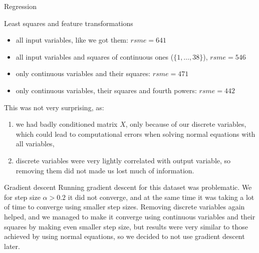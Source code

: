 \documentclass{article}
\begin{document}
\begin{section}{Regression}
\begin{subsection}{Least squares and feature transformations}
\begin{itemize}
\item all input variables, like we got them: $rsme=641$
\item all input variables and squares of continuous ones ($\{1, \ldots, 38\}$), $rsme = 546$
\item only continuous variables and their squares: $rsme = 471$
\item only continuous variables, their squares and fourth powers: $rsme = 442$
\end{itemize}
This was not very surprising, as:
\begin{enumerate}
\item we had badly conditioned matrix $X$, only because of our discrete variables, which could lead to computational errors when solving normal equations with all variables,
\item discrete variables were very lightly correlated with output variable, so removing them did not made us lost much of information.
\end{enumerate}
\end{subsection}
\begin{subsection}{Gradient descent}
Running gradient descent for this dataset was problematic. We for step size $\alpha > 0.2$ it did not converge, and at the same time it was taking a lot of time to converge using smaller step sizes. Removing discrete variables again helped, and we managed to make it converge using continuous variables and their squares by making even smaller step size, but results were very similar to those achieved by using normal equations, so we decided to not use gradient descent later.


\end{subsection}
\end{section}
\end{document}
